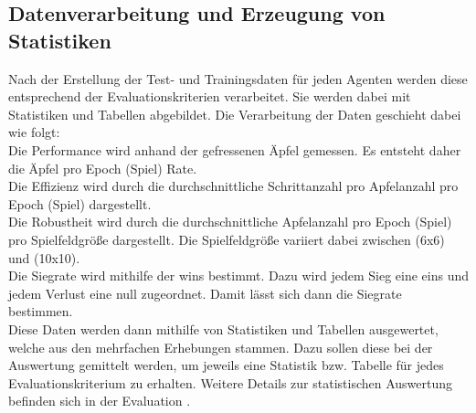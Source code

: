\subsection{Datenverarbeitung und Erzeugung von Statistiken} \label{subsec:Konzept_Datenverarbeitung}
Nach der Erstellung der Test- und Trainingsdaten für jeden Agenten werden diese entsprechend der Evaluationskriterien  verarbeitet. Sie werden dabei mit Statistiken und Tabellen abgebildet.
Die Verarbeitung der Daten geschieht dabei wie folgt:\\
Die Performance wird anhand der gefressenen Äpfel gemessen. Es entsteht daher die Äpfel pro Epoch (Spiel) Rate.\\
Die Effizienz wird durch die durchschnittliche Schrittanzahl pro Apfelanzahl pro Epoch (Spiel) dargestellt.\\
Die Robustheit wird durch die durchschnittliche Apfelanzahl pro Epoch (Spiel) pro Spielfeldgröße dargestellt.
Die Spielfeldgröße variiert dabei zwischen (6x6) und (10x10).\\
Die Siegrate wird mithilfe der wins bestimmt. Dazu wird jedem Sieg eine eins und jedem Verlust eine null zugeordnet. Damit lässt sich dann die Siegrate bestimmen.\\
Diese Daten werden dann mithilfe von Statistiken und Tabellen ausgewertet, welche aus den mehrfachen Erhebungen stammen. Dazu sollen diese bei der Auswertung gemittelt werden, um jeweils eine Statistik bzw. Tabelle für jedes Evaluationskriterium zu erhalten. 
Weitere Details zur statistischen Auswertung befinden sich in der Evaluation .
